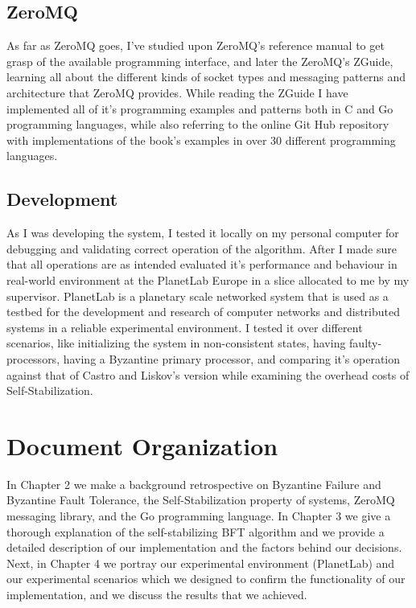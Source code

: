 \documentclass[12pt,a4paper]{report}
\begin{document}
			
			\subsection{ZeroMQ}
			As far as ZeroMQ goes, I've studied upon ZeroMQ's reference manual\cite{zmqref} to get grasp of the available programming interface, and later
			the ZeroMQ's ZGuide\cite{zguide}, learning all about the different kinds of socket types and messaging patterns and architecture that ZeroMQ
			provides. While reading the ZGuide I have implemented all of it's programming examples and patterns both in C and Go programming languages, 
			while also referring to the online Git Hub repository\cite{zguidegit} with implementations of the book's examples in over 30 different programming
			languages.


			\subsection{Development}
    			As I was developing the system, I tested it locally on my personal computer for debugging and validating correct operation of the algorithm. After I made sure that all operations are as intended evaluated it's performance and behaviour in real-world environment at the PlanetLab Europe \cite{planetLab} in a slice allocated to me by my supervisor. PlanetLab is a planetary scale networked system that is used as a testbed for the development and research of computer networks and distributed systems in a reliable experimental environment. I tested it over different scenarios, like initializing the system in non-consistent states, having faulty-processors, having a Byzantine primary processor, and comparing it's operation against that of Castro and Liskov's version while examining the overhead costs of Self-Stabilization.
    			
    	\section{Document Organization}
    	    In Chapter 2 we make a background retrospective on Byzantine Failure and Byzantine Fault Tolerance, the Self-Stabilization property of systems, ZeroMQ messaging library, and the Go programming language. In Chapter 3 we give a thorough explanation of the self-stabilizing BFT algorithm and we provide a detailed description of our implementation and the factors behind our decisions. Next, in Chapter 4 we portray our experimental environment (PlanetLab\cite{planetLab}) and our experimental scenarios which we designed to confirm the functionality of our implementation, and we discuss the results that we achieved.
				
\end{document}
